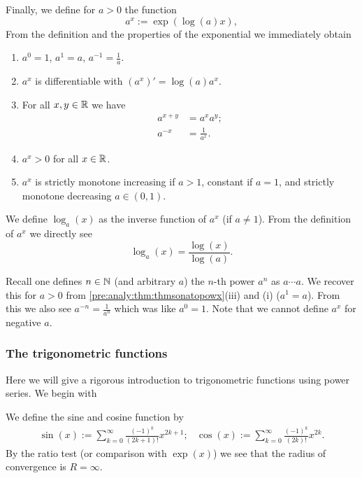 \documentclass[10pt, a4paper]{article}
\newcommand{\infsumo}[1][k = 0]{\sum_{#1}^{\infty}}
\begin{document}
Finally,
we define for $a > 0$ the function
\[
a ^ x := \exp(\log(a)x),
\]
From the definition and the properties of the exponential we immediately obtain
\begin{theorem}\label{pre:analy:thm:thmsonatopowx}
    \begin{enumerate}[label = (\roman*)]
        \item $a ^ 0 = 1$,
        $a ^ 1 = a$,
        $a ^ {-1} = \frac{1}{a}$.
        
        \item $a ^ x$ is differentiable with $(a ^ x)' = \log(a)a ^ x$.

        \item For all $x, y \in \mathbb{R}$ we have
        \begin{align*}
            a ^ {x + y} &= a ^ xa ^ y; \\
            a ^ {-x} &= \frac{1}{a ^ x}.
        \end{align*}
        
        \item $a ^ x > 0$ for all $x \in \mathbb{R}$.

        \item $a ^ x$ is strictly monotone increasing if $a > 1$,
        constant if $a = 1$,
        and strictly monotone decreasing $a \in (0, 1)$.
    \end{enumerate}
\end{theorem}

We define $\log_a(x)$ as the inverse function of $a ^ x$
(if $a \neq 1$).
From the definition of $a ^ x$ we directly see
\[
\log_a(x) = \frac{\log(x)}{\log(a)}.
\]
\begin{remark}
    Recall one defines $n \in \mathbb{N}$
    (and arbitrary $a$)
    the $n$-th power $a ^ n$ as $a \dotsi a$.
    We recover this for $a > 0$ from \autoref{pre:analy:thm:thmsonatopowx}(iii) and (i)
    ($a ^ 1 = a$).
    From this we also see $a ^ {-n} = \frac{1}{a ^ n}$ which was like $a ^ 0 = 1$.
    Note that we cannot define $a ^ x$ for negative $a$.
\end{remark}

\subsubsection{The trigonometric functions}

Here we will give a rigorous introduction to trigonometric functions using power series.
We begin with
\begin{definition}
    We define the sine and cosine function by
    \begin{align*}
        \sin(x) := \infsumo\frac{(-1) ^ k}{(2k + 1)!}x ^ {2k + 1};&\cos(x) := \infsumo\frac{(-1) ^ k}{(2k)!}x ^ {2k}.
    \end{align*}
    By the ratio test
    (or comparison with $\exp(x)$)
    we see that the radius of convergence is $R = \infty$.
\end{definition}
\end{document}
